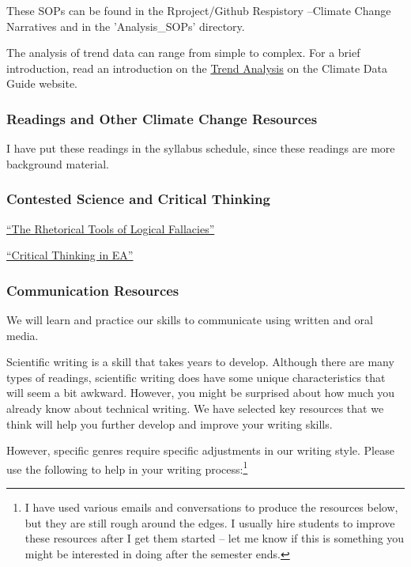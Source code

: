 \documentclass{article}\usepackage[]{graphicx}\usepackage[]{color}
\newenvironment{itemize*}%
  {\begin{itemize}%
    \setlength{\itemsep}{0pt}%
    \setlength{\parskip}{0pt}}%
  {\end{itemize}}
\begin{document}
These SOPs can be found in the Rproject/Github Respistory --Climate Change Narratives and in the 'Analysis\_SOPs' directory.

The analysis of trend data can range from simple to complex. For a brief introduction, read an introduction on the \href{https://climatedataguide.ucar.edu/climate-data-tools-and-analysis/trend-analysis}{Trend Analysis} on the Climate Data Guide website.

\subsubsection{Readings and Other Climate Change Resources}

I have put these readings in the syllabus schedule, since these readings are more background material. 

\subsubsection{Contested Science and Critical Thinking}


\begin{itemize*}
  \item \href{https://github.com/marclos/Climate_Change_Narratives/raw/master/Communication_Resources/Logical_Fallacies.pdf}{``The Rhetorical Tools of Logical Fallacies''}
  
  \item \href{https://github.com/marclos/Climate_Change_Narratives/raw/master/Communication_Resources/Critical_Thinking.pdf}{``Critical Thinking in EA''}
\end{itemize*}

\subsubsection{Communication Resources}

We will learn and practice our skills to communicate using written and oral media. 

Scientific writing is a skill that takes years to develop. Although there are many types of readings, scientific writing does have some unique characteristics that will seem a bit awkward. However, you might be surprised about how much you already know about technical writing. We have selected key resources that we think will help you further develop and improve your writing skills.

However, specific genres require specific adjustments in our writing style. Please use the following to help in your writing process:\footnote{I have used various emails and conversations to produce the resources below, but they are still rough around the edges. I usually hire students to improve these resources after I get them started -- let me know if this is something you might be interested in doing after the semester ends.}
\end{document}
